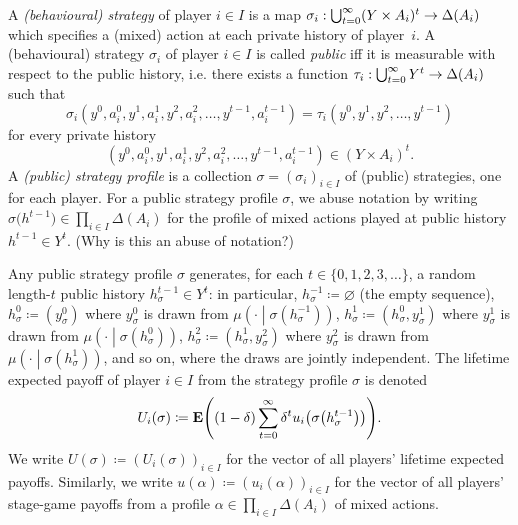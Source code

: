 A \emph{(behavioural) strategy} of player $i \in I$ is a map $\sigma_i : \bigcup_{t=0}^\infty (Y \times A_i)^t \to \Delta(A_i)$ which specifies a (mixed) action at each private history of player~$i$. A (behavioural) strategy $\sigma_i$ of player $i \in I$ is called \emph{public} iff it is measurable with respect to the public history, i.e. there exists a function $\tau_i : \bigcup_{t=0}^\infty Y^t \to \Delta(A_i)$ such that
%
\begin{equation*}
	\sigma_i\left(y^0,a^0_i,y^1,a^1_i,y^2,a^2_i,\dots,y^{t-1},a^{t-1}_i\right)
	= \tau_i\left( y^0, y^1, y^2, \dots, y^{t-1} \right)
\end{equation*}
%
for every private history
%
\begin{equation*}
	\left(y^0,a^0_i,y^1,a^1_i,y^2,a^2_i,\dots,y^{t-1},a^{t-1}_i\right)
	\in (Y \times A_i)^t .
\end{equation*}
%
A \emph{(public) strategy profile} is a collection $\sigma = (\sigma_i)_{i \in I}$ of (public) strategies, one for each player. For a public strategy profile $\sigma$, we abuse notation by writing $\sigma\bigl(h^{t-1}\bigr) \in \prod_{i \in I} \Delta(A_i)$ for the profile of mixed actions played at public history $h^{t-1} \in Y^t$. (Why is this an abuse of notation?)

Any public strategy profile $\sigma$ generates, for each $t \in \{0,1,2,3,\dots\}$, a random length-$t$ public history $h^{t-1}_\sigma \in Y^t$: in particular, $h^{-1}_\sigma \coloneqq \varnothing$ (the empty sequence), $h^0_\sigma \coloneqq (y^0_\sigma)$ where $y^0_\sigma$ is drawn from $\mu\left( \cdot \middle| \sigma\left( h^{-1}_\sigma \right) \right)$, $h^1_\sigma \coloneqq \left(h^0_\sigma,y^1_\sigma\right)$ where $y^1_\sigma$ is drawn from $\mu\left( \cdot \middle| \sigma\left( h^0_\sigma \right) \right)$, $h^2_\sigma \coloneqq \left(h^1_\sigma,y^2_\sigma\right)$ where $y^2_\sigma$ is drawn from $\mu\left( \cdot \middle| \sigma\left( h^1_\sigma \right) \right)$, and so on, where the draws are jointly independent. The lifetime expected payoff of player $i \in I$ from the strategy profile $\sigma$ is denoted
%
\begin{equation*}
	U_i(\sigma) \coloneqq \E\left( (1-\delta) \sum_{t=0}^\infty \delta^t u_i\left( \sigma\left(h^{t-1}_\sigma\right) \right) \right) .
\end{equation*}
%
We write $U(\sigma) \coloneqq (U_i(\sigma))_{i \in I}$ for the vector of all players' lifetime expected payoffs. Similarly, we write $u(\alpha) \coloneqq (u_i(\alpha))_{i \in I}$ for the vector of all players' stage-game payoffs from a profile $\alpha \in \prod_{i \in I} \Delta(A_i)$ of mixed actions.

